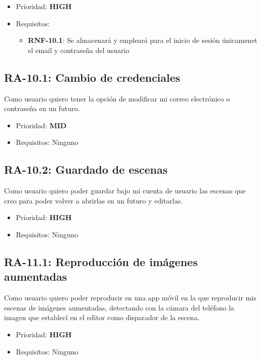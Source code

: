 \begin{itemize}
    \item Prioridad: \textbf{HIGH}
    \item Requisitos:
        \begin{itemize}
            \item \textbf{RNF-10.1}: Se almacenará y empleará para el inicio de sesión únicamenet el email y contraseña del usuario
        \end{itemize}
\end{itemize}

\subsection{RA-10.1: Cambio de credenciales}
Como usuario quiero tener la opción de modificar mi correo electrónico o contraseña en un futuro.

\begin{itemize}
    \item Prioridad: \textbf{MID}
    \item Requisitos: Ninguno
\end{itemize}

\subsection{RA-10.2: Guardado de escenas}
Como usuario quiero poder guardar bajo mi cuenta de usuario las escenas que creo para poder volver a abrirlas en un futuro y editarlas.

\begin{itemize}
    \item Prioridad: \textbf{HIGH}
    \item Requisitos: Ninguno
\end{itemize}

\subsection{RA-11.1: Reproducción de imágenes aumentadas}
Como usuario quiero poder reproducir en una app móvil en la que reproducir mis escenas de imágenes aumentadas, detectando con la cámara del teléfono la imagen que establecí en el editor como disparador de la escena.

\begin{itemize}
    \item Prioridad: \textbf{HIGH}
    \item Requisitos: Ninguno
\end{itemize}

